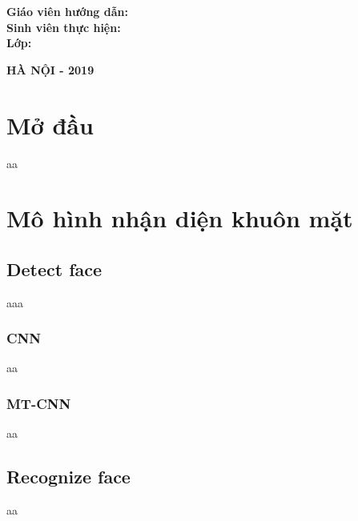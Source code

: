 \documentclass[12pt]{extreport}
\begin{document}
\begin{flushleft}
\hspace{1.5 cm} \textbf{ Giáo viên hướng dẫn:\hspace{0.2cm}{ Ts. TRẦN NGỌC THĂNG }}\\[0.2cm]
\hspace{1.5 cm} \textbf{ Sinh viên thực hiện\hspace{0.3cm}:}\\[0.2cm]
\hspace{1.5 cm} \textbf{ Lớp\hspace{3.8cm}:\hspace{0.2cm}{ KSTN TOÁN TIN - K60}}\\
\end{flushleft}

\vspace{1.0cm}
\begin{center}
\textbf{{\large HÀ NỘI - 2019}}\\
\end{center}

\tableofcontents

\newpage
\chapter*{Mở đầu}
aa

\newpage
\chapter{Mô hình nhận diện khuôn mặt }
\section{Detect face}
aaa
\subsection{CNN}
aa
\subsection{MT-CNN}
aa

\section{Recognize face}
aa
\end{document}
